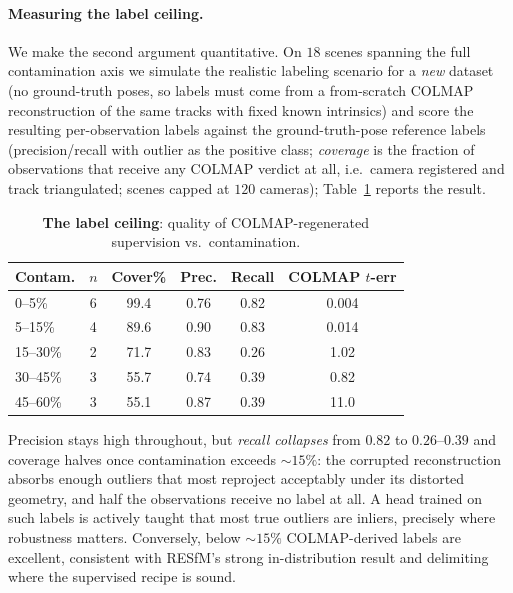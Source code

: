 \documentclass{article}
\begin{document}
\paragraph{Measuring the label ceiling.} We make the second argument quantitative. On $18$
scenes spanning the full contamination axis we simulate the realistic labeling scenario for
a \emph{new} dataset (no ground-truth poses, so labels must come from a from-scratch COLMAP
reconstruction of the same tracks with fixed known intrinsics) and score the resulting
per-observation labels against the ground-truth-pose reference labels
(precision/recall with outlier as the positive class; \emph{coverage} is the fraction of
observations that receive any COLMAP verdict at all, i.e.\ camera registered and track
triangulated; scenes capped at $120$ cameras); Table~\ref{tab:ceiling} reports the
result.
\begin{table}[t]\centering\footnotesize
\caption{\textbf{The label ceiling}: quality of COLMAP-regenerated supervision vs.\
contamination.}
\label{tab:ceiling}
\setlength{\tabcolsep}{3.5pt}%
\begin{tabular}{lccccc}
\toprule
Contam. & $n$ & Cover\% & Prec. & Recall & COLMAP $t$-err\\
\midrule
0--5\%    & 6 & 99.4 & 0.76 & 0.82 & 0.004\\
5--15\%   & 4 & 89.6 & 0.90 & 0.83 & 0.014\\
15--30\%  & 2 & 71.7 & 0.83 & $\mathbf{0.26}$ & 1.02\\
30--45\%  & 3 & 55.7 & 0.74 & $\mathbf{0.39}$ & 0.82\\
45--60\%  & 3 & 55.1 & 0.87 & $\mathbf{0.39}$ & 11.0\\
\bottomrule
\end{tabular}
\end{table}
Precision stays high throughout, but \emph{recall collapses} from $0.82$ to
$0.26$--$0.39$ and coverage halves once contamination exceeds ${\sim}15\%$: the corrupted
reconstruction absorbs enough outliers that most reproject acceptably under its distorted
geometry, and half the observations receive no label at all. A head trained on such labels
is actively taught that most true outliers are inliers, precisely where robustness
matters. Conversely, below ${\sim}15\%$ COLMAP-derived labels are excellent, consistent
with RESfM's strong in-distribution result and delimiting where the supervised recipe is
sound.
\end{document}

